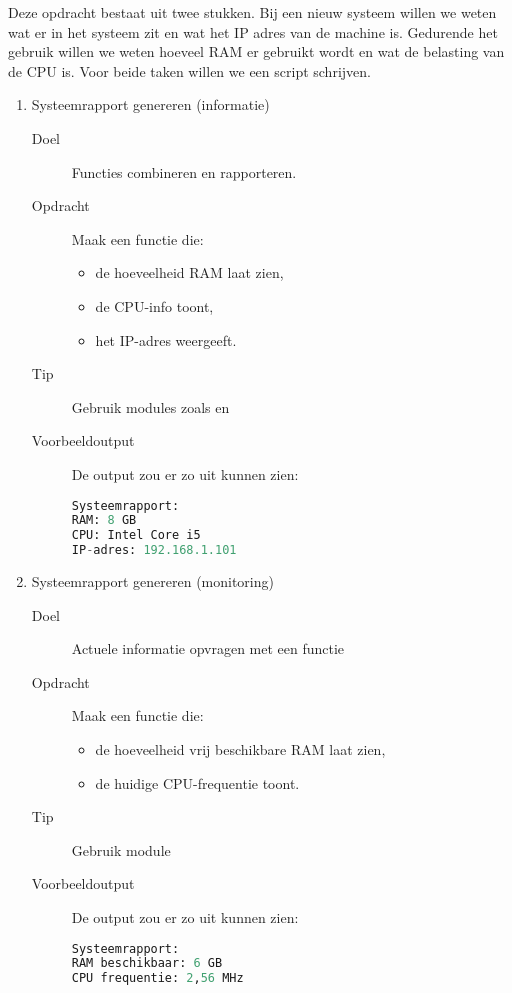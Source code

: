Deze opdracht bestaat uit twee stukken. Bij een nieuw systeem willen we weten wat er in het systeem zit en wat het IP adres van de machine is. Gedurende het gebruik willen we weten hoeveel RAM er gebruikt wordt en wat de belasting van de CPU is. Voor beide taken willen we een script schrijven.

\begin{enumerate}
\item Systeemrapport genereren (informatie)
	\begin{description}
	\item[Doel] Functies combineren en rapporteren.
	\item[Opdracht] Maak een functie  die:
		\begin{itemize}
		\item de hoeveelheid RAM laat zien,
		\item de CPU-info toont,
		\item het IP-adres weergeeft.
		\end{itemize}
	\item[Tip] Gebruik modules zoals  en 
	\item[Voorbeeldoutput] De output zou er zo uit kunnen zien:
\begin{lstlisting}[language=python]
Systeemrapport:
RAM: 8 GB
CPU: Intel Core i5
IP-adres: 192.168.1.101
\end{lstlisting}
	\end{description}

\item Systeemrapport genereren (monitoring)
	\begin{description}
	\item[Doel] Actuele informatie opvragen met een functie
	\item[Opdracht] Maak een functie  die:
		\begin{itemize}
		\item de hoeveelheid vrij beschikbare RAM laat zien,
		\item de huidige CPU-frequentie toont.
		\end{itemize}
	\item[Tip] Gebruik module 
	\item[Voorbeeldoutput] De output zou er zo uit kunnen zien:
\begin{lstlisting}[language=python]
Systeemrapport:
RAM beschikbaar: 6 GB
CPU frequentie: 2,56 MHz
\end{lstlisting}
	\end{description}
\end{enumerate}

